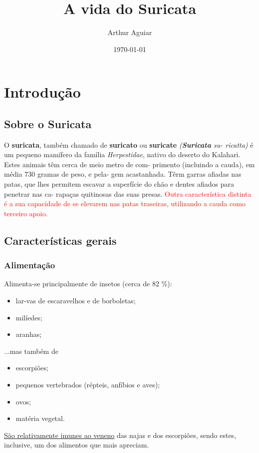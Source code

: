 \documentclass[a4paper,11pt]{report}
\title{A vida do Suricata}
\author{Arthur Aguiar}
\date {\today}
\begin{document}
\maketitle

\chapter{Introdução}

\section{Sobre o Suricata}
O \textbf{suricata}, também chamado de  \textbf{suricato} ou  \textbf{suricate} \textit{(\textbf{Suricata} su-
ricatta)} é um pequeno mamífero da família \textit{Herpestidae}, nativo do
deserto do Kalahari. Estes animais têm cerca de meio metro de com-
primento (incluindo a cauda), em média 730 gramas de peso, e pela-
gem acastanhada. Têrm garras afiadas nas patas, que lhes permitem
escavar a superfície do chão e dentes afiados para penetrar nas ca-
rapaças quitinosas das suas presas. \textcolor{red}{Outra característica distinta é a sua capacidade de se elevarem nas patas traseiras, utilizando a cauda como terceiro apoio.}

\section{Características gerais}
\subsection{Alimentação}
Alimenta-se principalmente de insetos (cerca de 82 \%):
\begin{itemize}
\item lar-vas de escaravelhos e de borboletas;
\item milíedes;
\item aranhas;
\end{itemize}
...mas também de
\begin{itemize}
\item escorpiões;
\item pequenos vertebrados (répteis, anfíbios e aves);
\item ovos;
\item matéria vegetal.
\end{itemize}

\uline{São relativamente imunes ao veneno} das najas
e dos escorpiões, sendo estes, inclusive, um dos alimentos que mais
apreciam.
\end{document}
